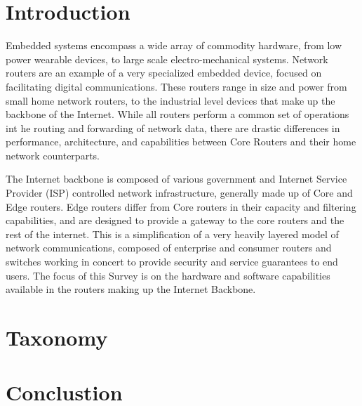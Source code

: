 \section{Introduction}
Embedded systems encompass a wide array of commodity hardware, from low power wearable devices, to large scale electro-mechanical systems. Network routers are an example of a very specialized embedded device, focused on facilitating digital communications. These routers range in size and power from small home network routers, to the industrial level devices that make up the backbone of the Internet. While all routers perform a common set of operations int he routing and forwarding of network data, there are drastic differences in performance, architecture, and capabilities between Core Routers and their home network counterparts.

The Internet backbone is composed of various government and Internet Service Provider (ISP) controlled network infrastructure, generally made up of Core and Edge routers. Edge routers differ from Core routers in their capacity and filtering capabilities, and are designed to provide a gateway to the core routers and the rest of the internet. This is a simplification of a very heavily layered model of network communications, composed of enterprise and consumer routers and switches working in concert to provide security and service guarantees to end users. The focus of this Survey is on the hardware and software capabilities available in the routers making up the Internet Backbone.


\section{Taxonomy}

\section{Conclustion}

